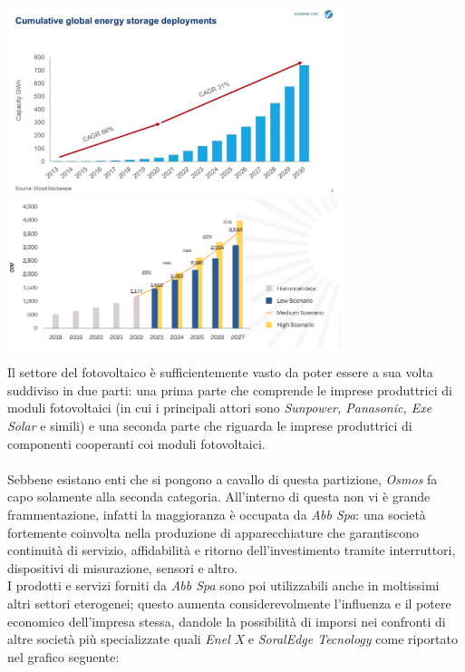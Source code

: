 \documentclass[a4paper, 12pt]{article}
\begin{document}
	\begin{center}
		\includegraphics[width=0.73\textwidth]{Images/previsioni_solare.jpg}
		\includegraphics[width=0.73\textwidth]{Images/andamento_pannelli2.png}
	\end{center}
	Il settore del fotovoltaico è sufficientemente vasto da poter essere a sua volta suddiviso in due parti: una prima parte che comprende le imprese produttrici di moduli fotovoltaici (in cui i principali attori sono \emph{Sunpower, Panasonic, Exe Solar} e simili) e una seconda parte che riguarda le imprese produttrici di componenti cooperanti coi moduli fotovoltaici.\\\\
	Sebbene esistano enti che si pongono a cavallo di questa partizione, \emph{Osmos} fa capo solamente alla seconda categoria. All'interno di questa non vi è grande frammentazione, infatti la maggioranza è occupata da \emph{Abb Spa}: una società fortemente coinvolta nella produzione di apparecchiature che garantiscono continuità di servizio, affidabilità e ritorno dell'investimento tramite interruttori, dispositivi di misurazione, sensori e altro.\\
	I prodotti e servizi forniti da \emph{Abb Spa} sono poi utilizzabili anche in moltissimi altri settori eterogenei; questo aumenta considerevolmente l'influenza e il potere economico dell'impresa stessa, dandole la possibilità di imporsi nei confronti di altre società più specializzate quali \emph{Enel X} e \emph{SoralEdge Tecnology} come riportato nel grafico seguente:\\
\end{document}
